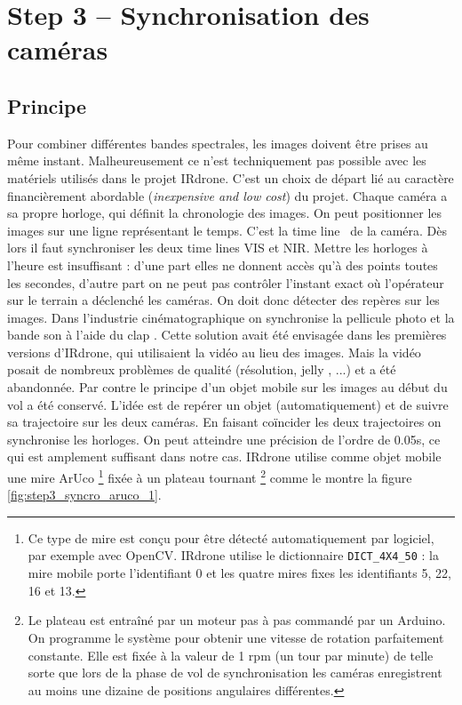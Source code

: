 \documentclass[a4paper,11pt]{report}
\newcommand{\legacyend}{}
\begin{document}
\legacyend

\chapter{Step 3 -- Synchronisation des caméras}\label{ch:step3}
\section{Principe}
Pour combiner différentes bandes spectrales, les images doivent être prises au même instant. Malheureusement ce n'est techniquement pas possible avec les matériels utilisés dans le projet IRdrone. C'est un choix de départ lié au caractère financièrement abordable (\emph{inexpensive and low cost}) du projet. Chaque caméra a sa propre horloge, qui définit la chronologie des images. On peut positionner les images sur une ligne représentant le temps. C'est la \og time line \fg~de la caméra. Dès lors il faut synchroniser les deux time lines VIS et NIR. Mettre les horloges à l'heure est insuffisant : d'une part elles ne donnent accès qu'à des points toutes les secondes, d'autre part on ne peut pas contrôler l'instant exact où l'opérateur sur le terrain a déclenché les caméras. On doit donc détecter des repères sur les images. Dans l'industrie cinématographique on synchronise la pellicule photo et la bande son à l'aide du \og clap \fg. Cette solution avait été envisagée dans les premières versions d'IRdrone, qui utilisaient la vidéo au lieu des images. Mais la vidéo posait de nombreux problèmes de qualité (résolution, \og jelly \fg, ...) et a été abandonnée. Par contre le principe d'un objet mobile sur les images au début du vol a été conservé. L'idée est de repérer un objet (automatiquement) et de suivre sa trajectoire sur les deux caméras. En faisant coïncider les deux trajectoires on synchronise les horloges. On peut atteindre une précision de l'ordre de 0.05s, ce qui est amplement suffisant dans notre cas.
IRdrone utilise comme objet mobile une mire ArUco 
\footnote{Ce type de mire est conçu pour être détecté automatiquement par logiciel, par exemple avec OpenCV. IRdrone utilise le dictionnaire \texttt{DICT\_4X4\_50} : la mire mobile porte l'identifiant 0 et les quatre mires fixes les identifiants 5, 22, 16 et 13.} 
fixée à un plateau tournant
\footnote{Le plateau est entraîné par un moteur pas à pas commandé par un Arduino. On programme le système pour obtenir une vitesse de rotation parfaitement constante. Elle est fixée à la valeur de 1 rpm (un tour par minute) de telle sorte que lors de la phase de vol de synchronisation les caméras enregistrent au moins une dizaine de positions angulaires différentes.} comme le montre la figure \ref{fig:step3_syncro_aruco_1}. 
\end{document}
